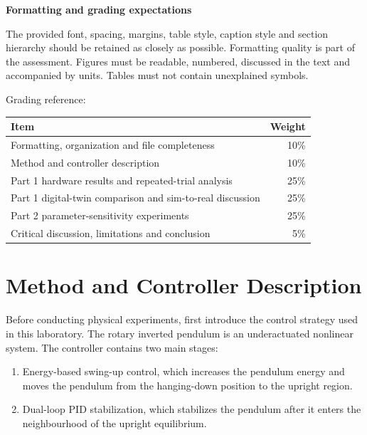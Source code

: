 \documentclass[11pt,a4paper]{article}
\begin{document}
\begin{requirementbox}
\textbf{Formatting and grading expectations}

The provided font, spacing, margins, table style, caption style and section hierarchy should be retained as closely as possible. Formatting quality is part of the assessment. Figures must be readable, numbered, discussed in the text and accompanied by units. Tables must not contain unexplained symbols.

Grading reference:
\begin{center}
\begin{tabular}{lr}
\toprule
Item & Weight\\
\midrule
Formatting, organization and file completeness & 10\%\\
Method and controller description & 10\%\\
Part 1 hardware results and repeated-trial analysis & 25\%\\
Part 1 digital-twin comparison and sim-to-real discussion & 25\%\\
Part 2 parameter-sensitivity experiments & 25\%\\
Critical discussion, limitations and conclusion & 5\%\\
\bottomrule
\end{tabular}
\end{center}
\end{requirementbox}
\clearpage
\fi

\tableofcontents
\clearpage

\section{Method and Controller Description}
\label{sec:method}

Before conducting physical experiments, first introduce the
control strategy used in this laboratory. The rotary inverted pendulum is an
underactuated nonlinear system. The controller contains two main stages:

\begin{enumerate}
    \item Energy-based swing-up control, which increases the pendulum energy
    and moves the pendulum from the hanging-down position to the upright region.
    \item Dual-loop PID stabilization, which stabilizes the pendulum after it
    enters the neighbourhood of the upright equilibrium.
\end{enumerate}
\end{document}
